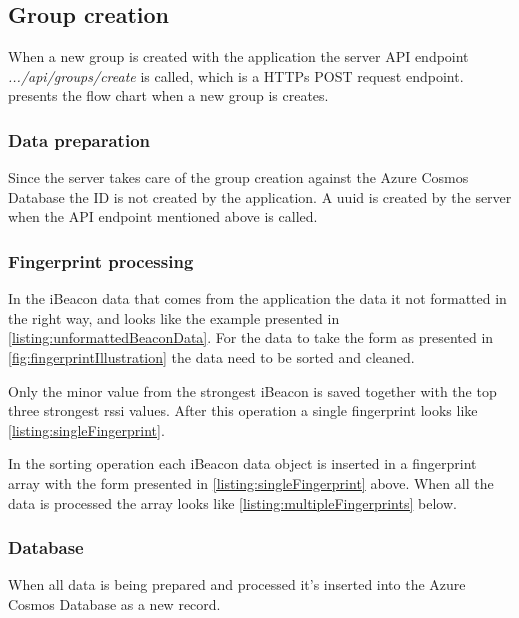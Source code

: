 \subsection{Group creation}\label{sec:implServerGroupCreation}
When a new group is created with the application the server API endpoint \textit{.../api/groups/create} is called, which is a HTTPs POST request \cite{POSTHTTPMDN} endpoint.
 presents the flow chart when a new group is creates.


\subsubsection{Data preparation}\label{sec:implServerGroupCreationDataPrep}
Since the server takes care of the group creation against the Azure Cosmos Database \cite{IntroductionAzureCosmos} the ID is not created by the application.
A \acrfull{uuid} \cite{CommonsIdUUID} is created by the server when the API endpoint mentioned above is called.

\subsubsection{Fingerprint processing}\label{sec:implServerGroupCreationFingerprint}

In the iBeacon data that comes from the application the data it not formatted in the right way, and looks like the example presented in \cref{listing:unformattedBeaconData}.
For the data to take the form as presented in \cref{fig:fingerprintIllustration} the data need to be sorted and cleaned.


Only the minor value from the strongest iBeacon is saved together with the top three strongest \acrshort{rssi} values. After this operation a single fingerprint looks like \cref{listing:singleFingerprint}.


In the sorting operation each iBeacon data object is inserted in a fingerprint array with the form presented in \cref{listing:singleFingerprint} above.
When all the data is processed the array looks like \cref{listing:multipleFingerprints} below.



\subsubsection{Database}\label{sec:implServerGroupCreationDatabase}
When all data is being prepared and processed it's inserted into the Azure Cosmos Database as a new record.

